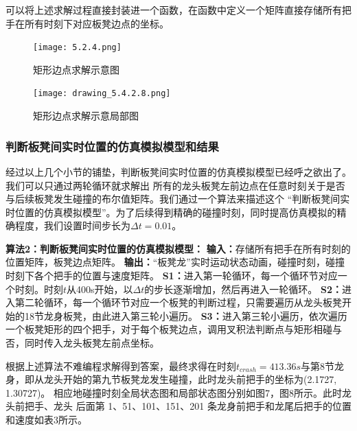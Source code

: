 \documentclass{cumcmthesis1}
\begin{document}
可以将上述求解过程直接封装进一个函数，在函数中定义一个矩阵直接存储所有把手在所有时刻下对应板凳边点的坐标。
\begin{figure}
    \caption{矩形边点求解示意图}
    \centering    
    \texttt{[image: 5.2.4.png]}
\end{figure}
\begin{figure}
    \caption{矩形边点求解示意局部图}
    \centering    
    \texttt{[image: drawing\_5.4.2.8.png]}
\end{figure}
\subsubsection{判断板凳间实时位置的仿真模拟模型和结果}
经过以上几个小节的铺垫，判断板凳间实时位置的仿真模拟模型已经呼之欲出了。我们可以只通过两轮循环就求解出
所有的龙头板凳左前边点在任意时刻关于是否与后续板凳发生碰撞的布尔值矩阵。我们通过一个算法来描述这个
“判断板凳间实时位置的仿真模拟模型”。为了后续得到精确的碰撞时刻，同时提高仿真模拟的精确程度，我们设置时间步长为$\Delta t=0.01$。
\par
\textbf{算法2：判断板凳间实时位置的仿真模拟模型：}
\newline
\noindent
\textbf{输入：}存储所有把手在所有时刻的位置矩阵，板凳边点矩阵。
\newline
\noindent
\textbf{输出：}“板凳龙”实时运动状态动画，碰撞时刻，碰撞时刻下各个把手的位置与速度矩阵。
\newline
\noindent
\textbf{S1：}进入第一轮循环，每一个循环节对应一个时刻。时刻$t$从400s开始，以$\Delta t$的步长逐渐增加，然后再进入一轮循环。
\newline
\noindent
\textbf{S2：}进入第二轮循环，每一个循环节对应一个板凳的判断过程，只需要遍历从龙头板凳开始的18节龙身板凳，由此进入第三轮小遍历。
\newline
\noindent
\textbf{S3：}进入第三轮小遍历，依次遍历一个板凳矩形的四个把手，对于每个板凳边点，调用叉积法判断点与矩形相碰与否，同时传入龙头板凳左前点坐标。
\par
根据上述算法不难编程求解得到答案，最终求得在时刻$t_{crash}=413.36s$与第8节龙身，即从龙头开始的第九节板凳龙发生碰撞，此时龙头前把手的坐标为(2.1727, 1.30727)。
相应地碰撞时刻全局状态图和局部状态图分别如图7，图8所示。此时龙头前把手、龙头
后面第 1、51、101、151、201 条龙身前把手和龙尾后把手的位置和速度如表3所示。
\end{document}
